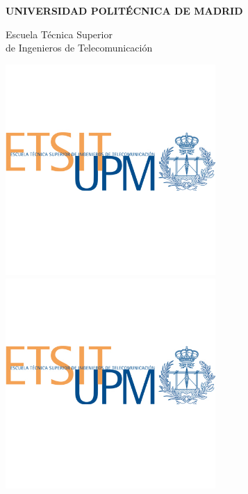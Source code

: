 \thispagestyle{empty}
\large
\vspace{3cm}
\begin{center}

  \Huge\textbf{UNIVERSIDAD POLITÉCNICA DE MADRID}

  \vspace{1cm}

  \huge{Escuela Técnica Superior\\de Ingenieros de Telecomunicación} 

  \vspace{1cm}

{
  \includegraphics[width=80mm]{logos/logoetsit_tamano.jpg}
}
{
  \includegraphics[width=80mm]{logos/logoetsit_tamano-cmyk.jpg}
}


  
  
  \LARGE\textbf{\mybooktitle}
  
  
  \mybookauthor

  \vspace{5mm}

  \myUPMdegree

  \vspace{1cm}

\end{center}

\begin{bottomparagraph}
  \begin{center}
    \huge{\mybookyear}
  \end{center}
\end{bottomparagraph}


\clearemptydoublepage

